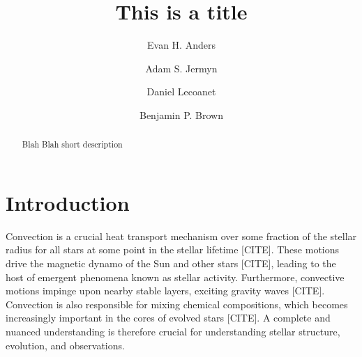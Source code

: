 \documentclass{aastex631}
\begin{document}
\title{This is a title}
\author[0000-0002-3433-4733]{Evan H. Anders}
\author[0000-0001-5048-9973]{Adam S. Jermyn}
\author{Daniel Lecoanet}
\author[0000-0001-8935-219X]{Benjamin P. Brown}


\begin{abstract}
Blah Blah short description
\end{abstract}



\section{Introduction}
\label{sec:introduction}
Convection is a crucial heat transport mechanism over some fraction of the stellar radius for all stars at some point in the stellar lifetime [CITE].
These motions drive the magnetic dynamo of the Sun and other stars [CITE], leading to the host of emergent phenomena known as stellar activity.
Furthermore, convective motions impinge upon nearby stable layers, exciting gravity waves [CITE].
Convection is also responsible for mixing chemical compositions, which becomes increasingly important in the cores of evolved stars [CITE].
A complete and nuanced understanding is therefore crucial for understanding stellar structure, evolution, and observations.
\end{document}
